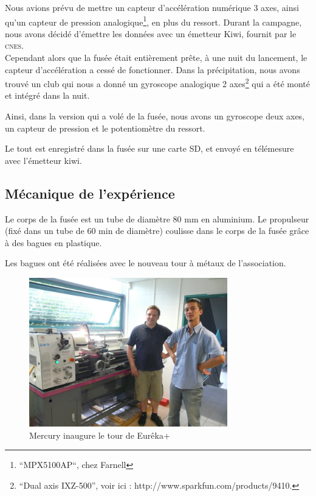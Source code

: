 \documentclass[a4paper,12pt]{scrartcl}
\begin{document}
		Nous avions prévu de mettre un capteur d'accélération numérique 3 axes, ainsi qu'un capteur de pression analogique\footnote{``MPX5100AP``, chez Farnell}, en plus du ressort.
		Durant la campagne, nous avons décidé d'émettre les données avec un émetteur Kiwi, fournit par le \textsc{cnes}. \\

		Cependant alors que la fusée était entièrement prête, à une nuit du lancement, le capteur d'accélération a cessé de fonctionner.
		Dans la précipitation, nous avons trouvé un club qui nous a donné un gyroscope analogique 2 axes\footnote{``Dual axis IXZ-500'', voir ici : http://www.sparkfun.com/products/9410.} qui a été monté et intégré dans la nuit.
		
		Ainsi, dans la version qui a volé de la fusée, nous avons un gyroscope deux axes, un capteur de pression et le potentiomètre du ressort.
		
		Le tout est enregistré dans la fusée sur une carte SD, et envoyé en télémesure avec l'émetteur kiwi.
	      \subsection{Mécanique de l'expérience}	
	      Le corps de la fusée est un tube de diamètre 80 mm en aluminium.
	      Le propulseur (fixé dans un tube de 60 min de diamètre) coulisse dans le corps de la fusée grâce à des bagues en plastique.
	      
	      Les bagues ont été réalisées avec le nouveau tour à métaux de l'association.
	     \begin{figure}[H]
		    \begin{center}
		      \caption{Mercury inaugure le tour de Eurêka+}
		      \includegraphics[height=244px, width=326px]{Photos_Mercury/tour.jpg}
		    \end{center}
	      \end{figure}
\end{document}
